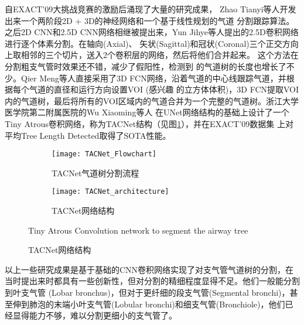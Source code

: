 	自EXACT'09大挑战竞赛的激励后涌现了大量的研究成果， Zhao Tianyi等人\cite{Zhao2019BronchusSA}开发出来一个两阶段2D + 3D的神经网络和一个基于线性规划的气道
	分割跟踪算法。之后2D CNN和2.5D CNN网络相继被提出来，Yun Jihye等人\cite{YUN201913}提出的2.5D卷积网络进行逐个体素分割。在轴向(Axial)、
	矢状(Sagittal)和冠状(Coronal)三个正交方向上取相邻的三个切片，送入2个卷积层的网络，然后将他们合并起来。 这个方法在分割粗支气管时效果还不错，减少了假阳性，检测到
	的气道树的长度也增长了不少。Qier Meng等人\cite{Meng2017TrackingAS}直接采用了3D FCN网络，沿着气道的中心线跟踪气道，并根据每个气道的直径和运行方向设置VOI
	(感兴趣	的立方体体积)，3D FCN提取VOI内的气道树，最后将所有的VOI区域内的气道合并为一个完整的气道树。浙江大学医学院第二附属医院的Wu Xiaoming等人
	\cite{Wu2021TACNet}在UNet网络结构的基础上设计了一个Tiny Atrous卷积网络，称为TACNet\cite{Wu2021TACNet}结构（见图\ref{fig:TACNet}），并在EXACT'09数据集
	上对平均Tree Length Detected取得了SOTA性能。
	\begin{figure}[!htp]
		\centering
		\begin{subfigure}{\textwidth}
			\centering
			\texttt{[image: TACNet\_Flowchart]}
			\caption{TACNet气道树分割流程}
		\end{subfigure}
		
		\vspace{5mm}
		
		\begin{subfigure}{\textwidth}
			\centering
			\texttt{[image: TACNet\_architecture]}
			\caption{TACNet网络结构}
		\end{subfigure}
			{Tiny Atrous Convolution network to segment the airway tree}
		\label{fig:TACNet}
	\end{figure}
	
	以上一些研究成果是基于基础的CNN卷积网络实现了对支气管气道树的分割，在当时提出来时都具有一些创新性，但对分割的精细程度显得不足。他们一般能分割到叶支气管
	(Lobar bronchus)，但对于更纤细的段支气管(Segmental bronchi)，甚至伸到肺泡的末端小叶支气管(Lobular bronchi)和细支气管(Bronchiole)，他们已经显得能力不够，难以分割更细小的支气管了。
	

